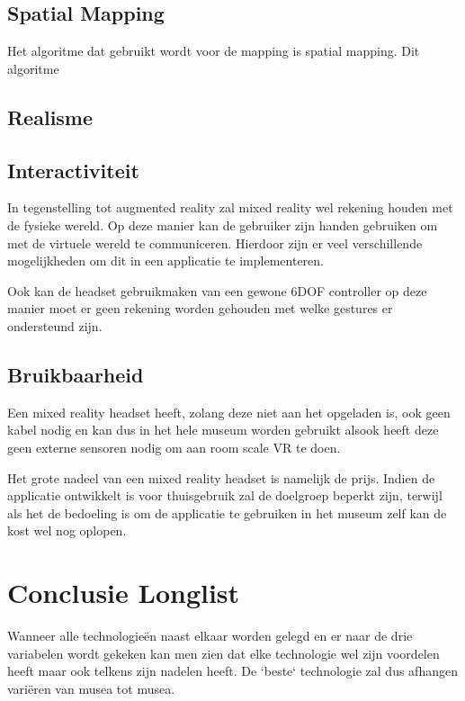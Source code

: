 
\subsection{Spatial Mapping}
Het algoritme dat gebruikt wordt voor de mapping is spatial mapping. Dit algoritme %

\subsection{Realisme}


\subsection{Interactiviteit}
In tegenstelling tot augmented reality zal mixed reality wel rekening houden met de fysieke wereld. Op deze manier kan de gebruiker zijn handen gebruiken om met de virtuele wereld te communiceren. Hierdoor zijn er veel verschillende mogelijkheden om dit in een applicatie te implementeren.

Ook kan de headset gebruikmaken van een gewone 6DOF controller op deze manier moet er geen rekening worden gehouden met welke gestures er ondersteund zijn.

\subsection{Bruikbaarheid}
Een mixed reality headset heeft, zolang deze niet aan het opgeladen is, ook geen kabel nodig en kan dus in het hele museum worden gebruikt alsook heeft deze geen externe sensoren nodig om aan room scale VR te doen. 

Het grote nadeel van een mixed reality headset is namelijk de prijs. Indien de applicatie ontwikkelt is voor thuisgebruik zal de doelgroep beperkt zijn, terwijl als het de bedoeling is om de applicatie te gebruiken in het museum zelf kan de kost wel nog oplopen.


\section{Conclusie Longlist}
Wanneer alle technologieën naast elkaar worden gelegd en er naar de drie variabelen wordt gekeken kan men zien dat elke technologie wel zijn voordelen heeft maar ook telkens zijn nadelen heeft. De `beste` technologie zal dus afhangen variëren van musea tot musea. 

